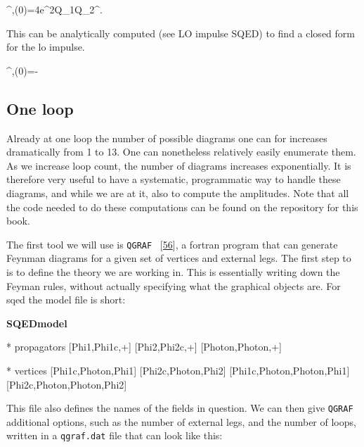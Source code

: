\documentclass[
  10pt,
  a4paper,
  DIV=11,
  numbers=noendperiod,
  twoside]{scrreprt}
\newenvironment{Shaded}{\begin{snugshade}}{\end{snugshade}}
\newcommand{\NormalTok}[1]{\textcolor[rgb]{0.00,0.23,0.31}{#1}}
\let\[\relax \let\]\relax %
\DeclareRobustCommand{\[}{\begin{equation}}
\DeclareRobustCommand{\]}{\end{equation}}
\begin{document}
\[
\Delta \emom[1]^{\mu,(0)}=4e^2Q_1Q_2\mass[1]\mass[2]\relfact\int\dn[4]{\tw}\tw^\mu {}.
\]

This can be analytically computed (see LO impulse SQED) to find a closed
form for the \gls{lo} impulse.

\[
\Delta \emom[1]^{\mu,(0)}=-  
\]

\hypertarget{one-loop}{%
\subsection{One loop}\label{one-loop}}

Already at one loop the number of possible diagrams one can for
increases dramatically from 1 to 13. One can nonetheless relatively
easily enumerate them. As we increase loop count, the number of diagrams
increases exponentially. It is therefore very useful to have a
systematic, programmatic way to handle these diagrams, and while we are
at it, also to compute the amplitudes. Note that all the code needed to
do these computations can be found on the repository for this book.

The first tool we will use is \texttt{QGRAF}
~{[}\protect\hyperlink{ref-Nogueira:1993a}{56}{]}, a fortran program
that can generate Feynman diagrams for a given set of vertices and
external legs. The first step to is to define the theory we are working
in. This is essentially writing down the Feyman rules, without actually
specifying what the graphical objects are. For \gls{sqed} the model file
is short:

\textbf{SQEDmodel}

\begin{Shaded}
\begin{Highlighting}[]
\NormalTok{* propagators}
\NormalTok{ [Phi1,Phi1c,+]}
\NormalTok{ [Phi2,Phi2c,+]}
\NormalTok{ [Photon,Photon,+]}

\NormalTok{* vertices}
\NormalTok{ [Phi1c,Photon,Phi1]}
\NormalTok{ [Phi2c,Photon,Phi2]}
\NormalTok{ [Phi1c,Photon,Photon,Phi1]}
\NormalTok{ [Phi2c,Photon,Photon,Phi2]}
\end{Highlighting}
\end{Shaded}

This file also defines the names of the fields in question. We can then
give \texttt{QGRAF} additional options, such as the number of external
legs, and the number of loops, written in a \texttt{qgraf.dat} file that
can look like this:
\end{document}
